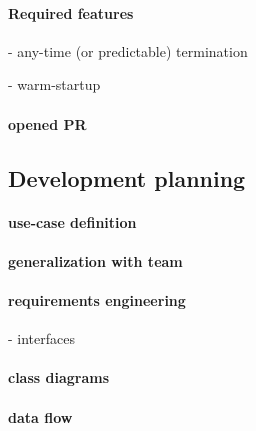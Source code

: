 \paragraph{Required features}
- any-time (or predictable) termination

- warm-startup

\paragraph{opened PR}


\subsection{Development planning}
\paragraph{use-case definition}
\paragraph{generalization with team}
\paragraph{requirements engineering}
- interfaces
\paragraph{class diagrams}
\paragraph{data flow}
